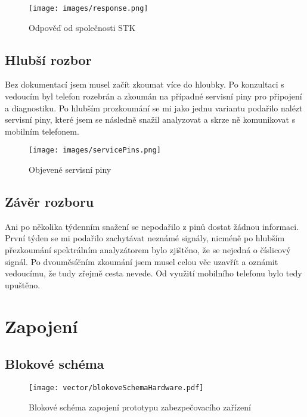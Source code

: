 \documentclass[FM,MP]{tulthesis}  %
\begin{document}
\begin{figure}[H]
\begin{center}
\texttt{[image: images/response.png]}
\caption{Odpověď od společnosti STK}
\label{image}
\end{center}
\end{figure}

\subsection{Hlubší rozbor}
Bez dokumentací jsem musel začít zkoumat více do hloubky. Po konzultaci s vedoucím byl telefon rozebrán a zkoumán na případné servisní piny pro připojení a diagnostiku. Po hlubším prozkoumání se mi jako jednu variantu podařilo nalézt servisní piny, které jsem se následně snažil analyzovat a skrze ně komunikovat s mobilním telefonem.

\begin{figure}[H]
\begin{center}
\texttt{[image: images/servicePins.png]}
\caption{Objevené servisní piny}
\label{image}
\end{center}
\end{figure}

\subsection{Závěr rozboru}
Ani po několika týdenním snažení se nepodařilo z pinů dostat žádnou informaci. První týden se mi podařilo zachytávat neznámé signály, nicméně po hlubším přezkoumání spektrálním  analyzátorem bylo zjištěno, že se nejedná o číslicový signál. Po dvouměsíčním zkoumání jsem musel celou věc uzavřít a oznámit vedoucímu, že tudy zřejmě cesta nevede. Od využití mobilního telefonu bylo tedy upuštěno.

\section{Zapojení}

\subsection{Blokové schéma}

\begin{figure}[H]
\begin{center}
\texttt{[image: vector/blokoveSchemaHardware.pdf]}
\caption{Blokové schéma zapojení prototypu zabezpečovacího zařízení}
\label{image}
\end{center}
\end{figure}
\end{document}
